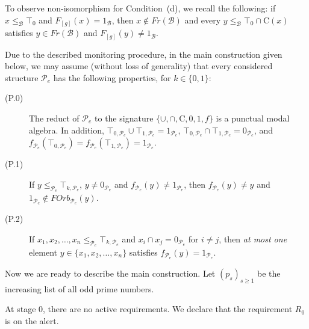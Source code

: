 \documentclass[a4paper,UKenglish,cleveref, autoref, thm-restate]{lipics-v2021}
\begin{document}
To observe non-isomorphism for Condition~(d), we recall the following: if $x\leq_{\mathcal{B}} \top_0$ and $F_{[g]}(x) = 1_{\mathcal{B}}$, then $x\not\in Fr(\mathcal{B})$ and every $y \leq_{\mathcal{B}} \top_0 \cap \mathrm{C}(x)$ satisfies $y\in Fr(\mathcal{B})$ and $F_{[g]}(y)\neq 1_{\mathcal{B}}$.



Due to the described monitoring procedure, in the main construction given below, we may assume (without loss of generality) that every considered structure $\mathcal{P}_e$ has the following properties, for $k\in\{ 0,1\}$:
\begin{description}
	\item[(P.0)] The reduct of $\mathcal{P}_e$ to the signature $\{\cup,\cap,\mathrm{C},0,1,f\}$ is a punctual modal algebra. In addition, $\top_{0,\mathcal{P}_e} \cup \top_{1,\mathcal{P}_e} = 1_{\mathcal{P}_e}$, $\top_{0,\mathcal{P}_e} \cap \top_{1,\mathcal{P}_e} = 0_{\mathcal{P}_e}$, and $f_{\mathcal{P}_e}(\top_{0,\mathcal{P}_e}) = f_{\mathcal{P}_e}(\top_{1,\mathcal{P}_e}) = 1_{\mathcal{P}_e}$.
	
	\item[(P.1)] If $y\leq_{\mathcal{P}_e} \! \top_{k,\mathcal{P}_e}$, $y \neq 0_{\mathcal{P}_e}$ and $f_{\mathcal{P}_e}(y) \neq 1_{\mathcal{P}_e}$, then $f_{\mathcal{P}_e}(y) \neq y$ and $1_{\mathcal{P}_e} \not\in FOrb_{\mathcal{P}_e}(y)$.
	
	\item[(P.2)] If $x_1,x_2,\dots,x_n \leq_{\mathcal{P}_e} \! \top_{k,\mathcal{P}_e}$ and $x_i \cap x_j = 0_{\mathcal{P}_e}$ for $i\neq j$, then \emph{at most one} element $y\in \{ x_1,x_2,\dots,x_n\}$ satisfies $f_{\mathcal{P}_e}(y) = 1_{\mathcal{P}_e}$.
\end{description}
Now we are ready to describe the main construction. Let $(p_s)_{s\geq 1}$ be the increasing list of all odd prime numbers.




 At stage $0$, there are no active requirements. We declare that the requirement $R_0$ is on the alert. 
\end{document}
